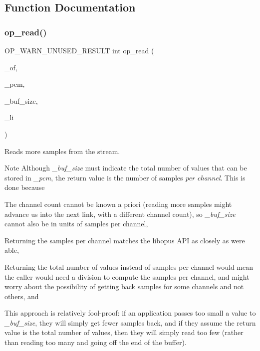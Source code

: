 \subsection{Function Documentation}
\mbox{\label{group__stream__decoding_ga963c917749335e29bb2b698c1cb20a10}} 
\subsubsection{\texorpdfstring{op\+\_\+read()}{op\_read()}}
{\footnotesize\ttfamily O\+P\+\_\+\+W\+A\+R\+N\+\_\+\+U\+N\+U\+S\+E\+D\+\_\+\+R\+E\+S\+U\+LT int op\+\_\+read (\begin{DoxyParamCaption}\item[{Ogg\+Opus\+File $\ast$}]{\+\_\+of,  }\item[{\hyperlink{opus__types_8h_acc9ed7cf60479eb81f9648c6ec27dc26}{opus\+\_\+int16} $\ast$}]{\+\_\+pcm,  }\item[{int}]{\+\_\+buf\+\_\+size,  }\item[{int $\ast$}]{\+\_\+li }\end{DoxyParamCaption})}

Reads more samples from the stream. \begin{DoxyNote}{Note}
Although {\itshape \+\_\+buf\+\_\+size} must indicate the total number of values that can be stored in {\itshape \+\_\+pcm}, the return value is the number of samples {\itshape per channel}. This is done because 
\begin{DoxyEnumerate}
\item The channel count cannot be known a priori (reading more samples might advance us into the next link, with a different channel count), so {\itshape \+\_\+buf\+\_\+size} cannot also be in units of samples per channel, 
\item Returning the samples per channel matches the {\ttfamily libopus} A\+PI as closely as we\textquotesingle{}re able, 
\item Returning the total number of values instead of samples per channel would mean the caller would need a division to compute the samples per channel, and might worry about the possibility of getting back samples for some channels and not others, and 
\item This approach is relatively fool-\/proof\+: if an application passes too small a value to {\itshape \+\_\+buf\+\_\+size}, they will simply get fewer samples back, and if they assume the return value is the total number of values, then they will simply read too few (rather than reading too many and going off the end of the buffer). 
\end{DoxyEnumerate}
\end{DoxyNote}

